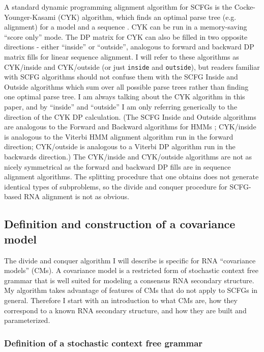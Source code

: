 \documentclass[11pt]{article}
\begin{document}
A standard dynamic programming alignment algorithm for SCFGs is the
Cocke-Younger-Kasami (CYK) algorithm, which finds an optimal parse
tree (e.g. alignment) for a model and a sequence
\cite{Kasami65,Younger67,HopcroftUllman79,Durbin98}. CYK can be run in
a memory-saving ``score only'' mode. The DP matrix for CYK can also be
filled in two opposite directions - either ``inside'' or ``outside'',
analogous to forward and backward DP matrix fills for linear sequence
alignment.  I will refer to these algorithms as CYK/inside and
CYK/outside (or just \texttt{inside} and \texttt{outside}), but
readers familiar with SCFG algorithms should not confuse them with the
SCFG Inside and Outside algorithms \cite{Lari90,Lari91} which sum over
all possible parse trees rather than finding one optimal parse tree. I
am always talking about the CYK algorithm in this paper, and by
``inside'' and ``outside'' I am only referring generically to the
direction of the CYK DP calculation. (The SCFG Inside and Outside
algorithms are analogous to the Forward and Backward algorithms for
HMMs \cite{Rabiner89,Durbin98}; CYK/inside is analogous to the Viterbi
HMM alignment algorithm run in the forward direction; CYK/outside is
analogous to a Viterbi DP algorithm run in the backwards direction.)
The CYK/inside and CYK/outside algorithms are not as nicely
symmetrical as the forward and backward DP fills are in sequence
alignment algorithms. The splitting procedure that one obtains does
not generate identical types of subproblems, so the divide and conquer
procedure for SCFG-based RNA alignment is not as obvious.

\subsection{Definition and construction of a covariance model}

The divide and conquer algorithm I will describe is specific for RNA
``covariance models'' (CMs). A covariance model is a restricted form
of stochastic context free grammar that is well suited for modeling a
consensus RNA secondary structure\cite{Eddy94,Durbin98}. My algorithm
takes advantage of features of CMs that do not apply to SCFGs in
general.  Therefore I start with an introduction to what CMs are, how
they correspond to a known RNA secondary structure, and how they are
built and parameterized.

\subsubsection{Definition of a stochastic context free grammar}
\end{document}
